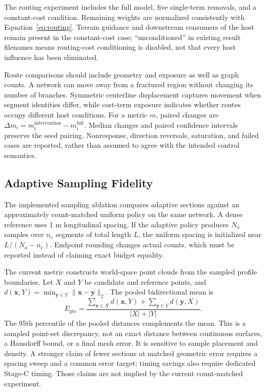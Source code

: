 \documentclass[conference]{IEEEtran}
\begin{document}
The routing experiment includes the full model, five single-term removals, and a constant-cost condition. Remaining weights are normalized consistently with Equation~\eqref{eq:routing}. Terrain guidance and downstream consumers of the host remain present in the constant-cost case; ``unconditioned'' in existing result filenames means routing-cost conditioning is disabled, not that every host influence has been eliminated.

Route comparisons should include geometry and exposure as well as graph counts. A network can move away from a fractured region without changing its number of branches. Symmetric centerline displacement captures movement when segment identities differ, while cost-term exposure indicates whether routes occupy different host conditions. For a metric $m$, paired changes are $\Delta m_i=m_i^{\mathrm{intervention}}-m_i^{\mathrm{full}}$. Median changes and paired confidence intervals preserve the seed pairing. Nonresponse, direction reversals, saturation, and failed cases are reported, rather than assumed to agree with the intended control semantics.

\subsection{Adaptive Sampling Fidelity}
The implemented sampling ablation compares adaptive sections against an approximately count-matched uniform policy on the same network. A dense reference uses 1 m longitudinal spacing. If the adaptive policy produces $N_a$ samples over $n_e$ segments of total length $L$, the uniform spacing is initialized near $L/(N_a-n_e)$. Endpoint rounding changes actual counts, which must be reported instead of claiming exact budget equality.

The current metric constructs world-space point clouds from the sampled profile boundaries. Let $X$ and $Y$ be candidate and reference points, and $d(\mathbf{x},Y)=\min_{\mathbf{y}\in Y}\|\mathbf{x}-\mathbf{y}\|_2$. The pooled bidirectional mean is
\begin{equation}
E_{\mathrm{pts}}=
\frac{\sum_{\mathbf{x}\in X}d(\mathbf{x},Y)+
\sum_{\mathbf{y}\in Y}d(\mathbf{y},X)}{|X|+|Y|}.
\label{eq:error}
\end{equation}
The 95th percentile of the pooled distances complements the mean. This is a sampled point-set discrepancy, not an exact distance between continuous surfaces, a Hausdorff bound, or a final mesh error. It is sensitive to sample placement and density. A stronger claim of fewer sections at matched geometric error requires a spacing sweep and a common error target; timing savings also require dedicated Stage-C timing. Those claims are not implied by the current count-matched experiment.
\end{document}
